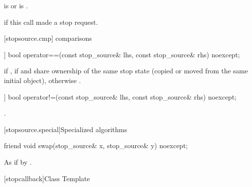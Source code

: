 {\begin{itemdescr}
  \pnum\postconditions {} is  or  is .

  \pnum\returns {} if this call made a stop request.
\end{itemdescr}


[stopsource.cmp]{ comparisons}

%
\begin{itemdecl}
[[nodiscard]] bool operator==(const stop_source& lhs, const stop_source& rhs) noexcept;
\end{itemdecl}
\begin{itemdescr}
  \pnum\returns {} if ,
                 if  and  share ownership
                of the same stop state
                (copied or moved from the same initial  object),
                otherwise .
\end{itemdescr}

%
\begin{itemdecl}
[[nodiscard]] bool operator!=(const stop_source& lhs, const stop_source& rhs) noexcept;
\end{itemdecl}
\begin{itemdescr}
  \pnum\returns {}.
\end{itemdescr}


[stopsource.special]{Specialized algorithms}

%
\begin{itemdecl}
friend void swap(stop_source& x, stop_source& y) noexcept;
\end{itemdecl}

\begin{itemdescr}
\pnum\effects As if by .
\end{itemdescr}



%
[stopcallback]{Class Template }

\pnum
{}%

}
